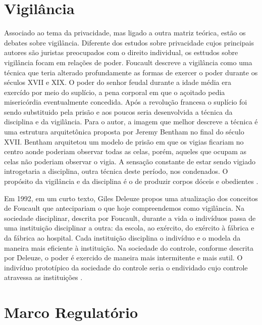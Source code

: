 \section{Vigilância}
\label{sec:vigilancia}

Associado ao tema da privacidade, mas ligado a outra matriz teórica, estão os debates sobre vigilância.
Diferente dos estudos sobre privacidade cujos principais autores são juristas preocupados com o direito individual, os esttudos sobre vigilância focam em relações de poder.
Foucault descreve a vigilância como uma técnica que teria alterado profundamente as formas de exercer o poder durante os séculos XVII e XIX.
O poder do senhor feudal durante a idade média era exercído por meio do suplício, a pena corporal em que o açoitado pedia misericórdia eventualmente concedida.
Após a revolução francesa o suplício foi sendo substituido pela prisão e aos poucos seria desenvolvida a técnica da disciplina e da vigilância.
Para o autor, a imagem que melhor descreve a técnica é uma estrutura arquitetônica proposta por Jeremy Bentham no final do século XVII.
Bentham arquitetou um modelo de prisão em que os vigias ficariam no centro aonde poderiam observar todas as celas, porém, aqueles que ocupam as celas não poderiam observar o vigia.
A sensação constante de estar sendo vigiado introgetaria a disciplina, outra técnica deste período, nos condenados.
O propósito da vigilância e da disciplina é o de produzir corpos dóceis e obedientes \cite{Foucault96}.

Em 1992, em um curto texto, Giles Deleuze propos uma atualização dos conceitos de Foucault que antecipariam o que hoje compreendemos como vigilância.
Na sociedade disciplinar, descrita por Foucault, durante a vida o indivíduos passa de uma instituição disciplinar a outra: da escola, ao exército, do exército à fábrica e da fábrica ao hospital.
Cada instituição disciplina o indivíduo e o modela da maneira mais eficiente à instituição.
Na sociedade do controle, conforme descrita por Deleuze, o poder é exercido de maneira mais intermitente e mais sutil.
O indivíduo prototípico da sociedade do controle seria o endividado cujo controle atravessa as instituições \cite{Deleuze92}.

\section{Marco Regulatório}
\label{sec:marco-regulatorio}

